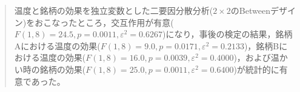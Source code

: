 \begin{quote}
	温度と銘柄の効果を独立変数とした二要因分散分析($2 \times 2$のBetweenデザイン)をおこなったところ，交互作用が有意($F(1,8)=24.5,p=0.0011,\varepsilon^2=0.6267$)になり，事後の検定の結果，銘柄Aにおける温度の効果($F(1,8)=9.0,p=0.0171,\varepsilon^2=0.2133$)，銘柄Bにおける温度の効果($F(1,8)=16.0,p=0.0039,\varepsilon^2=0.4000$)，および温かい時の銘柄の効果($F(1,8)=25.0,p=0.0011,\varepsilon^2=0.6400$)が統計的に有意であった。
\end{quote}
